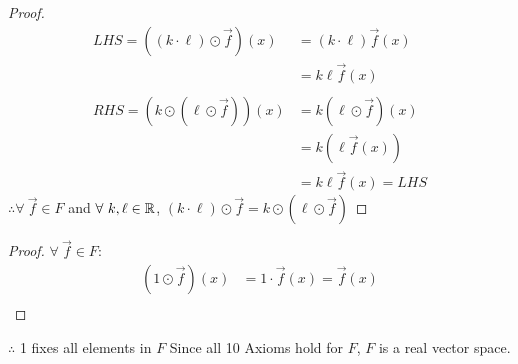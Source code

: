 \begin{enumerate}
\begin{proof}
\begin{align*}
      LHS = ((k \cdot \ell) \odot \vec{f})(x) & = (k \cdot \ell)\vec{f}(x) \\
                                              & = k\ell\vec{f}(x)          \\ \\
      RHS = (k \odot (\ell \odot \vec{f}))(x) & = k(\ell \odot \vec{f})(x) \\
                                              & = k(\ell\vec{f}(x))        \\
                                              & = k\ell\vec{f}(x) = LHS
    \end{align*}
    $\therefore \forall~\vec{f} \in F$ and $\forall~k, \ell \in \mathbb{R}$, $(k \cdot \ell) \odot \vec{f} = k \odot (\ell \odot \vec{f})$
  \end{proof}
  \begin{proof}
    $\forall~\vec{f} \in F$:
    \begin{align*}
      (1 \odot \vec{f})(x) & = 1\cdot\vec{f}(x) = \vec{f}(x) \\
    \end{align*}
  \end{proof}
  $\therefore$ 1 fixes all elements in $F$
  Since all 10 Axioms hold for $F$, $F$ is a real vector space.
\end{enumerate}

